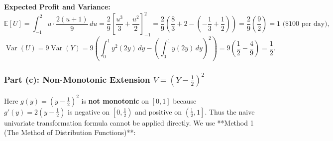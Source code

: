 \documentclass[11pt, letterpaper]{article}
\theoremstyle{definition}
\theoremstyle{remark}
\newcommand{\E}{\mathbb{E}}
\begin{document}
\textbf{Expected Profit and Variance:}
\[
    \E[U] = \int_{-1}^2 u \cdot \frac{2(u+1)}{9} \, du = \frac{2}{9} \left[ \frac{u^3}{3} + \frac{u^2}{2} \right]_{-1}^2 = \frac{2}{9}\left(\frac{8}{3} + 2 - \left(-\frac{1}{3} + \frac{1}{2}\right)\right) = \frac{2}{9}\left(\frac{9}{2}\right) = 1 \text{ (\$100 per day)},
\]
\[
    \operatorname{Var}(U) = 9\operatorname{Var}(Y) = 9\left(\int_0^1 y^2(2y)\,dy - \left(\int_0^1 y(2y)\,dy\right)^2\right) = 9\left(\frac{1}{2} - \frac{4}{9}\right) = \frac{1}{2}.
\]

\subsubsection*{Part (c): Non-Monotonic Extension $V = \left(Y - \frac{1}{2}\right)^2$}
Here $g(y) = \left(y - \frac{1}{2}\right)^2$ is \textbf{not monotonic} on $[0, 1]$ because $g'(y) = 2\left(y - \frac{1}{2}\right)$ is negative on $\left[0, \frac{1}{2}\right)$ and positive on $\left(\frac{1}{2}, 1\right]$. Thus the naive univariate transformation formula cannot be applied directly. We use **Method 1 (The Method of Distribution Functions)**:
\end{document}
